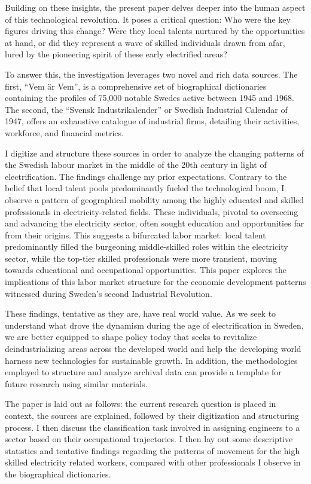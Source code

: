 \documentclass[
]{article}
\begin{document}
Building on these insights, the present paper delves deeper into the
human aspect of this technological revolution. It poses a critical
question: Who were the key figures driving this change? Were they local
talents nurtured by the opportunities at hand, or did they represent a
wave of skilled individuals drawn from afar, lured by the pioneering
spirit of these early electrified areas?

To answer this, the investigation leverages two novel and rich data
sources. The first, ``Vem är Vem'', is a comprehensive set of
biographical dictionaries containing the profiles of 75,000 notable
Swedes active between 1945 and 1968. The second, the ``Svensk
Industrikalender'' or Swedish Industrial Calendar of 1947, offers an
exhaustive catalogue of industrial firms, detailing their activities,
workforce, and financial metrics.

I digitize and structure these sources in order to analyze the changing
patterns of the Swedish labour market in the middle of the 20th century
in light of electrification. The findings challenge my prior
expectations. Contrary to the belief that local talent pools
predominantly fueled the technological boom, I observe a pattern of
geographical mobility among the highly educated and skilled
professionals in electricity-related fields. These individuals, pivotal
to overseeing and advancing the electricity sector, often sought
education and opportunities far from their origins. This suggests a
bifurcated labor market: local talent predominantly filled the
burgeoning middle-skilled roles within the electricity sector, while the
top-tier skilled professionals were more transient, moving towards
educational and occupational opportunities. This paper explores the
implications of this labor market structure for the economic development
patterns witnessed during Sweden's second Industrial Revolution.

These findings, tentative as they are, have real world value. As we seek
to understand what drove the dynamism during the age of electrification
in Sweden, we are better equipped to shape policy today that seeks to
revitalize deindustrializing areas across the developed world and help
the developing world harness new technologies for sustainable growth. In
addition, the methodologies employed to structure and analyze archival
data can provide a template for future research using similar materials.

The paper is laid out as follows: the current research question is
placed in context, the sources are explained, followed by their
digitization and structuring process. I then discuss the classification
task involved in assigning engineers to a sector based on their
occupational trajectories. I then lay out some descriptive statistics
and tentative findings regarding the patterns of movement for the high
skilled electricity related workers, compared with other professionals I
observe in the biographical dictionaries.
\end{document}
